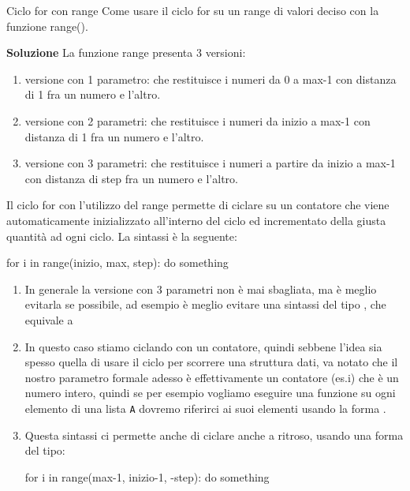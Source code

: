 \documentclass[10pt]{extarticle}
\makeatletter
\newcommand{\<}{\langle}
\renewcommand{\>}{\rangle}
\renewenvironment{proof}[1][\proofname] {\par\pushQED{\qed}
\renewcommand*{\proofname}{Soluzione}
{\normalfont\sffamily\bfseries\topsep6\p@\@plus6\p@\relax #1\@addpunct{.} }}{\popQED\endtrivlist\@endpefalse}
\theoremstyle{mystyle}{\newtheorem*{remark}{Nota}}
\theoremstyle{mystyle}{\newtheorem*{remarks}{Note}}
\theoremstyle{mystyle}{\newtheorem*{example}{Esempio}}
\theoremstyle{mystyle}{\newtheorem*{examples}{Esempi}}
\theoremstyle{definition}{\newtheorem*{exercise}{Exercise}}
\theoremstyle{warn}
\makeatother
\begin{document}
\begin{definition}{Ciclo for con range}{}
Come usare il ciclo for su un range di valori deciso con la funzione range().
\end{definition}
\begin{proof}
La funzione range presenta 3 versioni:
\begin{enumerate}
    \item versione con 1 parametro:  che restituisce i numeri da 0 a max-1 con distanza di 1 fra un numero e l'altro.
    \item versione con 2 parametri:  che restituisce i numeri da inizio a max-1 con distanza di 1 fra un numero e l'altro.
    \item versione con 3 parametri:  che restituisce i numeri a partire da inizio a max-1 con distanza di step fra un numero e l'altro.
\end{enumerate}
Il ciclo for con l'utilizzo del range permette di ciclare su un contatore che viene automaticamente inizializzato all'interno del ciclo ed incrementato della giusta quantità ad ogni ciclo. La sintassi è la seguente:
\begin{python}
for i in range(inizio, max, step):
    do something
\end{python}
\end{proof}
\begin{remarks} \leavevmode
\begin{enumerate}
    \item In generale la versione con 3 parametri non è mai sbagliata, ma è meglio  evitarla se possibile, ad esempio è meglio evitare una sintassi del tipo , che equivale a 
    \item In questo caso stiamo ciclando con un contatore, quindi sebbene l'idea sia spesso quella di usare il ciclo per scorrere una struttura dati, va notato che il nostro parametro formale adesso è effettivamente un contatore (es.i) che è un numero intero, quindi se per esempio vogliamo eseguire una funzione su ogni elemento di una lista \texttt{A} dovremo riferirci ai suoi elementi usando la forma .
    \item Questa sintassi ci permette anche di ciclare anche a ritroso, usando una forma del tipo:
    \begin{python}
for i in range(max-1, inizio-1, -step):
    do something
    \end{python}
\end{enumerate}
\end{remarks}
\end{document}

